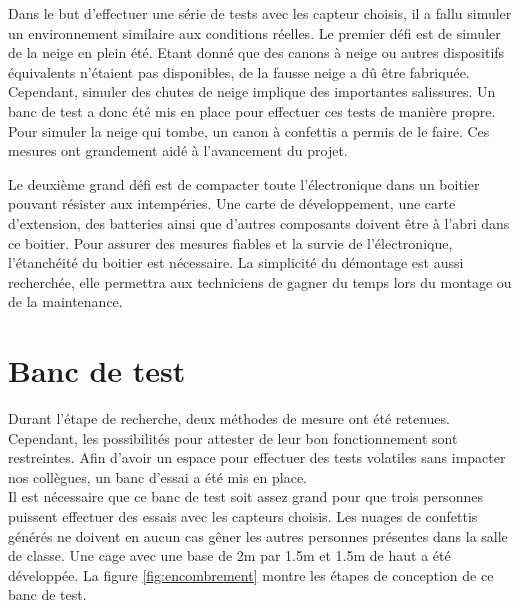 Dans le but d'effectuer une série de tests avec les capteur choisis, il a fallu simuler un environnement 
similaire aux conditions réelles. Le premier défi est de simuler de la neige en plein été. Etant donné 
que des canons à neige ou autres dispositifs équivalents n’étaient pas disponibles, de la fausse neige 
a dû être fabriquée. Cependant, simuler des chutes de neige implique des importantes salissures. Un 
banc de test a donc été mis en place pour effectuer ces tests de manière propre. Pour simuler la neige 
qui tombe, un canon à confettis a permis de le faire. Ces mesures ont grandement aidé à l’avancement 
du projet.\par 
Le deuxième grand défi est de compacter toute l'électronique dans un boitier pouvant résister aux 
intempéries. Une carte de développement, une carte d'extension, des batteries ainsi que d’autres composants 
doivent être à l’abri dans ce boitier. Pour assurer des mesures fiables et la survie de l’électronique, 
l’étanchéité du boitier est nécessaire. La simplicité du démontage est aussi recherchée, elle permettra 
aux techniciens de gagner du temps lors du montage ou de la maintenance.

\section{Banc de test}

Durant l’étape de recherche, deux méthodes de mesure ont été retenues. Cependant, les possibilités pour 
attester de leur bon fonctionnement sont restreintes. Afin d’avoir un espace pour effectuer des tests 
volatiles sans impacter nos collègues, un banc d’essai a été mis en place. \\
Il est nécessaire que ce banc de test soit assez grand pour que trois personnes puissent effectuer des 
essais avec les capteurs choisis. Les nuages de confettis générés ne doivent en aucun cas gêner les 
autres personnes présentes dans la salle de classe. Une cage avec une base de 2m par 1.5m et 1.5m de 
haut a été développée. La figure \ref{fig:encombrement} montre les étapes de conception de ce banc 
de test.

